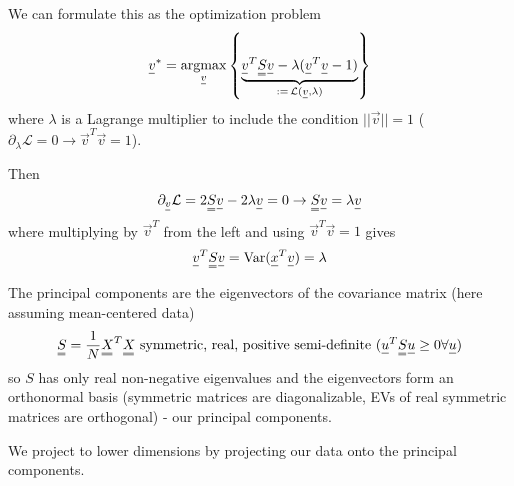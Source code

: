 We can formulate this as the optimization problem
\begin{equation}
    \vec{v}^* = \argmax_{\vec{v}} \left\{ \underbrace{\vec{v}^T \mat{S} \vec{v} - \lambda (\vec{v}^T \vec{v} - 1)}_{:=\,\mathcal{L}(\vec{v},\lambda)} \right\}
\end{equation}
where $\lambda$ is a Lagrange multiplier to include the condition $||\vec{v}|| = 1$ ($\partial_{\lambda} \mathcal{L} = 0
\rightarrow \vec{v}^T \vec{v} = 1$).

Then
\begin{equation}
    \partial_{\vec{v}} \mathcal{L} = 2 \mat{S} \vec{v} - 2 \lambda \vec{v} = 0 \rightarrow \mat{S} \vec{v} = \lambda \vec{v}
\end{equation}
where multiplying by $\vec{v}^T$ from the left and using $\vec{v}^T \vec{v} = 1$ gives
\begin{equation}
    \vec{v}^T \mat{S} \vec{v} = \Var(\vec{x}^T\vec{v}) = \lambda
\end{equation}



The principal components are the eigenvectors of the covariance matrix
(here assuming mean-centered data)
\begin{equation}
    \mat{S} = \frac{1}{N} \mat{X}^T \mat{X} \text{ symmetric, real, positive semi-definite } (\vec{u}^T \mat{S} \vec{u} \geq 0 \forall \vec{u})
\end{equation}
so $S$ has only real non-negative eigenvalues and the eigenvectors form an orthonormal basis
(symmetric matrices are diagonalizable, EVs of real symmetric matrices are orthogonal) - our principal
components.


We project to lower dimensions by projecting our data onto the principal components.


